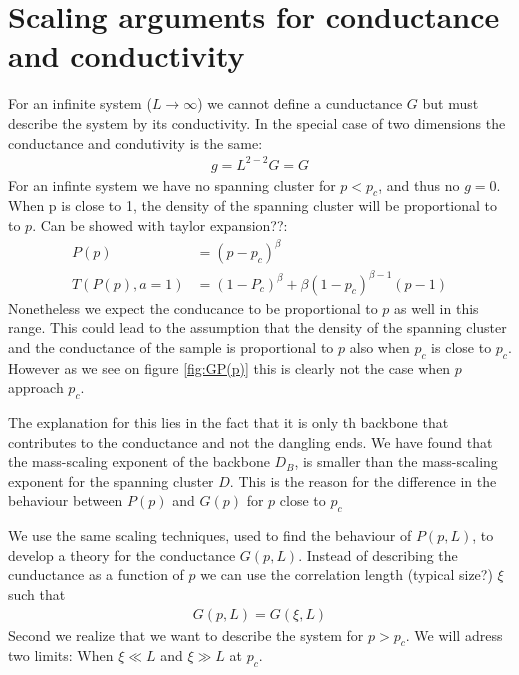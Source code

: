 \documentclass[reprint, amsmath, amssymb, aps]{revtex4-2}
\begin{document}
\section{Scaling arguments for conductance and conductivity}
For an infinite system ($L\to\infty$) we cannot define a cunductance $G$ but must describe the system by its conductivity. In the special case of two dimensions the conductance and condutivity is the same:
\begin{align*}
  g = L^{2-2}G = G
\end{align*}
For an infinte system we have no spanning cluster for $p < p_c$, and thus no $g = 0$. When p is close to 1, the density of the spanning cluster will be proportional to to $p$. Can be showed with taylor expansion??:
\begin{align*}
  P(p) &= (p-p_c)^{\beta} \\
  T(P(p), a = 1) &= (1-P_c)^{\beta} + \beta(1-p_c)^{\beta-1}(p-1)
\end{align*}
Nonetheless we expect the conducance to be proportional to $p$ as well in this range. This could lead to the assumption that the density of the spanning cluster and the conductance of the sample is proportional to $p$ also when $p_c$ is close to $p_c$. However as we see on figure \ref{fig:GP(p)} this is clearly not the case when $p$ approach $p_c$.\par
The explanation for this lies in the fact that it is only th backbone that contributes to the conductance and not the dangling ends. We have found that the mass-scaling exponent of the backbone $D_B$, is smaller than the mass-scaling exponent for the spanning cluster $D$. This is the reason for the difference in the behaviour between $P(p)$ and $G(p)$ for $p$ close to $p_c$\par
We use the same scaling techniques, used to find the behaviour of $P(p,L)$, to develop a theory for the conductance $G(p,L)$. Instead of describing the cunductance as a function of $p$ we can use the correlation length (typical size?) $\xi$ such that
\begin{align*}
  G(p,L) = G(\xi,L)
\end{align*}
Second we realize that we want to describe the system for $p > p_c$. We will adress two limits: When $\xi \ll L$ and $\xi \gg L$ at $p_c$.
\end{document}

